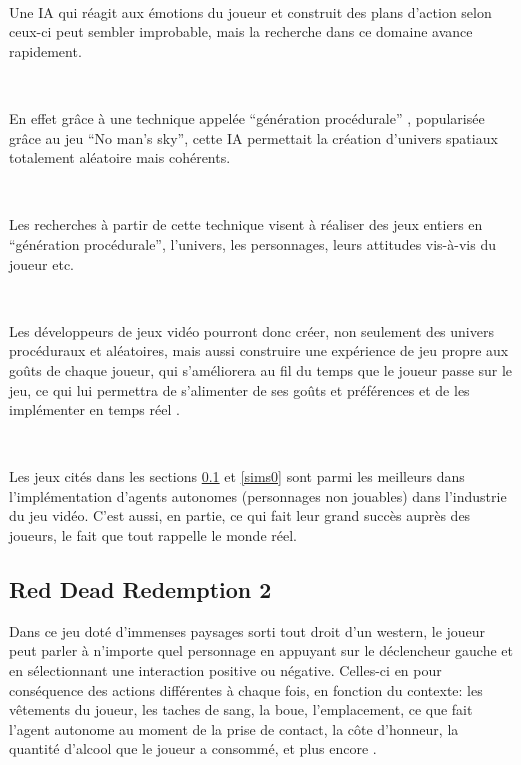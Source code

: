 ~\par
Une IA qui réagit aux émotions du joueur et construit des plans d’action selon ceux-ci peut sembler improbable, mais la recherche dans ce domaine avance rapidement.

~\par
En effet grâce à une technique appelée “génération procédurale” \parencite{generation}, popularisée grâce au jeu “No man’s sky”, cette IA permettait la création d’univers spatiaux totalement aléatoire mais cohérents.

~\par
Les recherches à partir de cette technique visent à réaliser des jeux entiers en “génération procédurale”, l’univers, les personnages, leurs attitudes vis-à-vis du joueur etc.

~\par
Les développeurs de jeux vidéo pourront donc créer, non seulement des univers procéduraux et aléatoires, mais aussi construire une expérience de jeu propre aux goûts de chaque joueur, qui s’améliorera au fil du temps que le joueur passe sur le jeu, ce qui lui permettra de s’alimenter de ses goûts et préférences et de les implémenter en temps réel \parencite{youtubeIA}.

~\par
Les jeux cités dans les sections \ref{red} et \ref{sims0} sont parmi les meilleurs dans l’implémentation d’agents autonomes (personnages non jouables) dans l’industrie du jeu vidéo. C’est aussi, en partie, ce qui fait leur grand succès auprès des joueurs, le fait que tout rappelle le monde réel.



\subsection{Red Dead Redemption 2}\label{red}

Dans ce jeu doté d’immenses paysages sorti tout droit d’un western, le joueur peut parler à n’importe quel personnage en appuyant sur le déclencheur gauche et en sélectionnant une interaction positive ou négative. Celles-ci en pour conséquence des actions différentes à chaque fois, en fonction du contexte: les vêtements du joueur, les taches de sang, la boue, l’emplacement, ce que fait l’agent autonome au moment de la prise de contact, la côte d’honneur, la quantité d’alcool que le joueur a consommé, et plus encore \parencite{red}.


